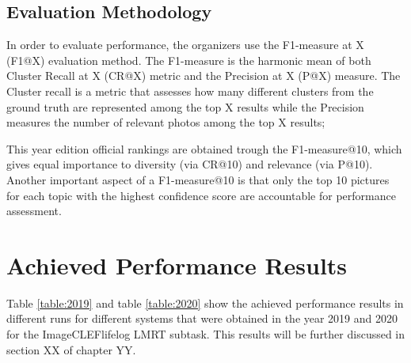         \subsection{Evaluation Methodology}
        \label{sec:eval}

        In order to evaluate performance, the organizers use the F1-measure at X (F1@X) evaluation method. The F1-measure is the harmonic mean of both Cluster Recall at X (CR@X) metric and the Precision at X (P@X) measure. The Cluster recall is a metric that assesses how many different clusters from the ground truth are represented among the top X results  while the Precision measures the number of  relevant photos among the top X results;

        This year edition official rankings are obtained trough the F1-measure@10, which gives equal importance to diversity (via CR@10) and relevance (via P@10). Another important aspect of a F1-measure@10 is that only the top 10 pictures for each topic with the highest confidence score are accountable for performance assessment.

    
    \newpage
    \section{Achieved Performance Results}
    \label{sec:perfomance_results}
    
    Table \ref{table:2019} and table \ref{table:2020} show the achieved performance results in different runs for different systems that were obtained in the year 2019 and 2020 for the ImageCLEFlifelog LMRT subtask. This results will be further discussed in section XX of chapter YY.
    
